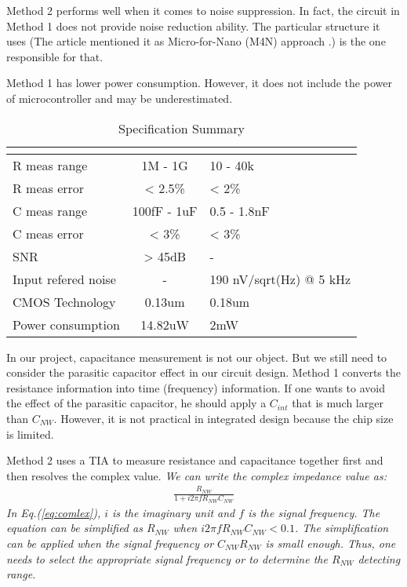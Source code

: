Method 2 performs well when it comes to noise suppression.
In fact, the circuit in Method 1 does not provide noise reduction ability.
The particular structure it uses (The article \cite{Juv1} mentioned it as Micro-for-Nano (M4N) approach \cite{M4N}.) is the one responsible for that.

Method 1 has lower power consumption. However, it does not include the power of microcontroller and may be underestimated.

\begin{table}[!htb]
    {\fontfamily{}\fontsize{10}{14}\selectfont
    \centering
    \begin{tabular}{l|cp{4cm}}
        & \cite{Juv2} & \cite{Jlockin}\\
        \hline
        R meas range & 1M - 1G & 10 - 40k\\
        \hline
        R meas error & < 2.5\% & < 2\%\\
        \hline
        C meas range & 100fF - 1uF & 0.5 - 1.8nF\\
        \hline
        C meas error & < 3\% & < 3\%\\
        \hline
        SNR & > 45dB & - \\
        \hline
        Input refered noise & - & 190 nV/sqrt(Hz) @ 5 kHz \\
        \hline
        CMOS Technology & 0.13um & 0.18um\\
        \hline
        Power consumption & 14.82uW & 2mW\\
    \end{tabular}
    \caption{Specification Summary}
    \label{tb:LVtable}
    }
\end{table}

In our project, capacitance measurement is not our object.
But we still need to consider the parasitic capacitor effect in our circuit design.
Method 1 converts the resistance information into time (frequency) information.
If one wants to avoid the effect of the parasitic capacitor, he should apply a $C_{int}$ that is much larger than $C_{NW}$.
However, it is not practical in integrated design because the chip size is limited.

Method 2 uses a TIA to measure resistance and capacitance together first and then resolves the complex value.
\emph{We can write the complex impedance value as:
\begin{align}
      \frac{R_{NW}}{1 + i2\pi f R_{NW} C_{NW}} \label{eq:comlex}
\end{align}
In Eq.(\ref{eq:comlex}), $i$ is the imaginary unit and $f$ is the signal frequency.
The equation can be simplified as $R_{NW}$ when $i2\pi f R_{NW} C_{NW} < 0.1$.
The simplification can be applied when the signal frequency or $C_{NW} R_{NW}$ is small enough.
Thus, one needs to select the appropriate signal frequency or to determine the $R_{NW}$ detecting range.}

